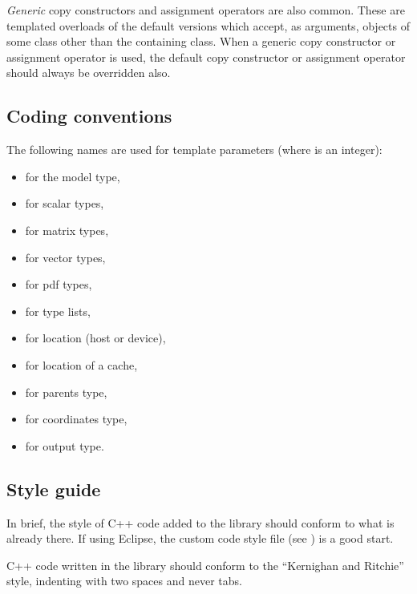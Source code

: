 \emph{Generic} copy constructors and assignment operators are also
common. These are templated overloads of the default versions which accept, as
arguments, objects of some class other than the containing class. When a
generic copy constructor or assignment operator is used, the default copy
constructor or assignment operator should always be overridden also.

\subsection{Coding conventions}

The following names are used for template parameters (where  is an
integer):
\begin{itemize}
\item {} for the model type,
\item {} for scalar types,
\item {} for matrix types,
\item {} for vector types,
\item {} for pdf types,
\item {} for type lists,
\item {} for location (host or device),
\item {} for location of a cache,
\item {} for parents type,
\item {} for coordinates type,
\item {} for output type.
\end{itemize}

\subsection{Style guide}

In brief, the style of C++ code added to the library should conform to what is
already there. If using Eclipse, the custom code style file (see
) is a good start.

C++ code written in the library should conform to the ``Kernighan and Ritchie''
style, indenting with two spaces and never tabs.
